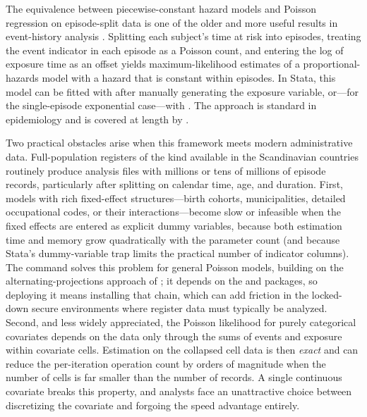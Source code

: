 \documentclass[12pt,a4paper]{article}
\begin{document}
\label{sec:intro}

The equivalence between piecewise-constant hazard models and Poisson
regression on episode-split data is one of the older and more useful
results in event-history analysis
\citep{holford1980, laird1981, whitehead1980}. Splitting each subject's
time at risk into episodes, treating the event indicator in each episode
as a Poisson count, and entering the log of exposure time as an offset
yields maximum-likelihood estimates of a proportional-hazards model with
a hazard that is constant within episodes. In Stata, this model can be
fitted with  after manually generating the exposure
variable, or---for the single-episode exponential case---with
. The approach is standard in
epidemiology \citep{clayton1993, carstensen2007} and is covered at
length by \citet{rabe2022}.

Two practical obstacles arise when this framework meets modern
administrative data. Full-population registers of the kind available in
the Scandinavian countries routinely produce analysis files with
millions or tens of millions of episode records, particularly after
splitting on calendar time, age, and duration. First, models with rich
fixed-effect structures---birth cohorts, municipalities, detailed
occupational codes, or their interactions---become slow or infeasible
when the fixed effects are entered as explicit dummy variables, because
both estimation time and memory grow quadratically with the parameter
count (and because Stata's dummy-variable trap limits the practical
number of indicator columns). The  command
\citep{correia2020} solves this problem for general Poisson models,
building on the alternating-projections approach of
\citet{guimaraes2010}; it depends on the  and
 packages, so deploying it means installing that chain,
which can add friction in the locked-down secure environments where
register data must typically be analyzed. Second, and less widely
appreciated, the Poisson likelihood for purely categorical covariates
depends on the data only through the sums of events and exposure within
covariate cells. Estimation on the collapsed cell data is then
\emph{exact} and can reduce the per-iteration operation count by orders
of magnitude when the number of cells is far smaller than the number of
records. A single continuous covariate breaks this property, and
analysts face an unattractive choice between discretizing the covariate
and forgoing the speed advantage entirely.
\end{document}
